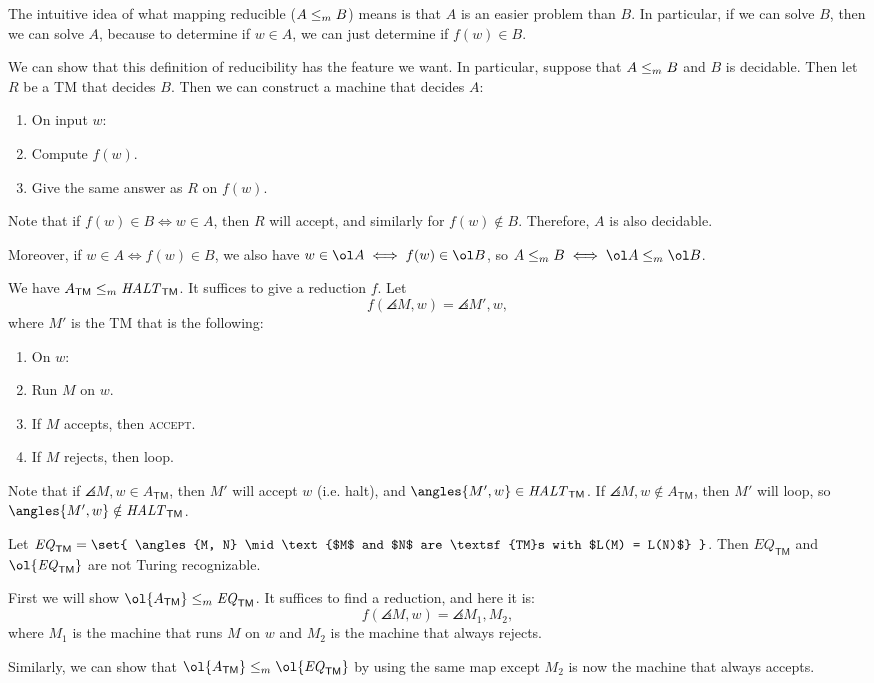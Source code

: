 \documentclass{standalone}
\begin{document}
The intuitive idea of what mapping reducible (\(A \mathrel{\leq_m} B\)) means is that \(A\) is an easier problem than \(B\). In particular, if we can solve \(B\), then we can solve \(A\), because to determine if \(w \in A\), we can just determine if \(f(w) \in B\).

We can show that this definition of reducibility has the feature we want. In particular, suppose that \(A \mathrel{\leq_m} B\) and \(B\) is decidable. Then let \(R\) be a \textsf{TM} that decides \(B\). Then we can construct a machine that decides \(A\):
\begin{enumerate}[start=0]
	\item On input \(w\):
	\item Compute \(f(w)\).
	\item Give the same answer as \(R\) on \(f(w)\).
\end{enumerate}
Note that if \(f(w) \in B \iff w \in A\), then \(R\) will accept, and similarly for \(f(w) \notin B\). Therefore, \(A\) is also decidable.

Moreover, if \(w \in A \iff f(w) \in B\), we also have \(w \in \ol A \iff f(w) \in \ol B\), so \(A \mapredu B \iff \ol A \mapredu \ol B\).


\begin{example}
	We have \(A_{\textsf{TM}} \mathrel{\leq_m} \mathit{HALT}_{\textsf{TM}}\).
	\tcblower
	It suffices to give a reduction \(f\). Let
	\[
		f(\angles{M, w}) = \angles{M', w},
	\]
	where \(M'\) is the \textsf{TM} that is the following:
	\begin{enumerate}[start=0]
		\item On \(w\):
		\item Run \(M\) on \(w\).
		\item If \(M\) accepts, then \textsc{accept}.
		\item If \(M\) rejects, then loop.
	\end{enumerate}

	Note that if \(\angles{M, w} \in A_{\textsf{TM}}\), then \(M'\) will accept \(w\) (i.e. halt), and \(\angles{M', w} \in \HALT_{\textsf{TM}}\). If \(\angles{M, w} \notin A_{\textsf{TM}}\), then \(M'\) will loop, so \(\angles{M', w} \notin \HALT_{\textsf{TM}}\).
\end{example}

\begin{example}
	Let \(\mathit{EQ}_{\textsf{TM}} = \set{
		\angles{M, N} \mid \text{$M$ and $N$ are \textsf{TM}s with $L(M) = L(N)$}
	}\). Then \(\mathit{EQ}_{\textsf{TM}}\) and \(\ol{\mathit{EQ}_{\textsf{TM}}}\) are not Turing recognizable.
	\tcblower
	
	First we will show \(\ol{A_{\textsf{TM}}} \mapredu \mathit{EQ}_{\textsf{TM}}\). It suffices to find a reduction, and here it is:
	\[
		f(\angles{M, w}) = \angles{M_1, M_2},
	\]
	where \(M_1\) is the machine that runs \(M\) on \(w\) and \(M_2\) is the machine that always rejects.

	Similarly, we can show that \(\ol{A_{\textsf{TM}}} \mapredu \ol{\mathit{EQ}_{\textsf{TM}}}\) by using the same map except \(M_2\) is now the machine that always accepts.
\end{example}
\end{document}
